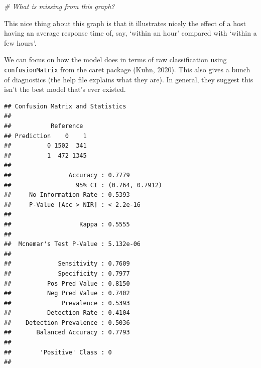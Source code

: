 \documentclass[
]{book}
\newenvironment{Shaded}{\begin{snugshade}}{\end{snugshade}}
\newcommand{\CommentTok}[1]{\textcolor[rgb]{0.56,0.35,0.01}{\textit{#1}}}
\newcommand{\DataTypeTok}[1]{\textcolor[rgb]{0.13,0.29,0.53}{#1}}
\newcommand{\KeywordTok}[1]{\textcolor[rgb]{0.13,0.29,0.53}{\textbf{#1}}}
\newcommand{\NormalTok}[1]{#1}
\newcommand{\OperatorTok}[1]{\textcolor[rgb]{0.81,0.36,0.00}{\textbf{#1}}}
\begin{document}
\begin{Shaded}
\begin{Highlighting}[]
\CommentTok{# What is missing from this graph?}
\end{Highlighting}
\end{Shaded}

This nice thing about this graph is that it illustrates nicely the effect of a host having an average response time of, say, `within an hour' compared with `within a few hours'.

We can focus on how the model does in terms of raw classification using \texttt{confusionMatrix} from the caret package (Kuhn, 2020). This also gives a bunch of diagnostics (the help file explains what they are). In general, they suggest this isn't the best model that's ever existed.

\begin{Shaded}
\end{Shaded}

\begin{verbatim}
## Confusion Matrix and Statistics
## 
##           Reference
## Prediction    0    1
##          0 1502  341
##          1  472 1345
##                                          
##                Accuracy : 0.7779         
##                  95% CI : (0.764, 0.7912)
##     No Information Rate : 0.5393         
##     P-Value [Acc > NIR] : < 2.2e-16      
##                                          
##                   Kappa : 0.5555         
##                                          
##  Mcnemar's Test P-Value : 5.132e-06      
##                                          
##             Sensitivity : 0.7609         
##             Specificity : 0.7977         
##          Pos Pred Value : 0.8150         
##          Neg Pred Value : 0.7402         
##              Prevalence : 0.5393         
##          Detection Rate : 0.4104         
##    Detection Prevalence : 0.5036         
##       Balanced Accuracy : 0.7793         
##                                          
##        'Positive' Class : 0              
## 
\end{verbatim}
\end{document}
